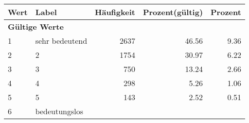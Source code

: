      \begin{longtable}{lXrrr}
     \toprule
     \textbf{Wert} & \textbf{Label} & \textbf{Häufigkeit} & \textbf{Prozent(gültig)} & \textbf{Prozent} \\
     \endhead
     \midrule
     \multicolumn{5}{l}{\textbf{Gültige Werte}}\\

     1 &
     \multicolumn{1}{X}{ sehr bedeutend   } &


       \num{2637} &
       \num[round-mode=places,round-precision=2]{46,56} &
         \num[round-mode=places,round-precision=2]{9,36} \\

     2 &
     \multicolumn{1}{X}{ 2   } &


       \num{1754} &
       \num[round-mode=places,round-precision=2]{30,97} &
         \num[round-mode=places,round-precision=2]{6,22} \\

     3 &
     \multicolumn{1}{X}{ 3   } &


       \num{750} &
       \num[round-mode=places,round-precision=2]{13,24} &
         \num[round-mode=places,round-precision=2]{2,66} \\

     4 &
     \multicolumn{1}{X}{ 4   } &


       \num{298} &
       \num[round-mode=places,round-precision=2]{5,26} &
         \num[round-mode=places,round-precision=2]{1,06} \\

     5 &
     \multicolumn{1}{X}{ 5   } &


       \num{143} &
       \num[round-mode=places,round-precision=2]{2,52} &
         \num[round-mode=places,round-precision=2]{0,51} \\

     6 &
     \multicolumn{1}{X}{ bedeutungslos   } &



\end{longtable}
